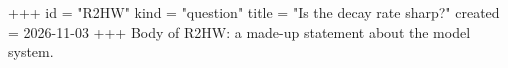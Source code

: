 +++
id = "R2HW"
kind = "question"
title = "Is the decay rate sharp?"
created = 2026-11-03
+++
Body of R2HW: a made-up statement about the model system.
